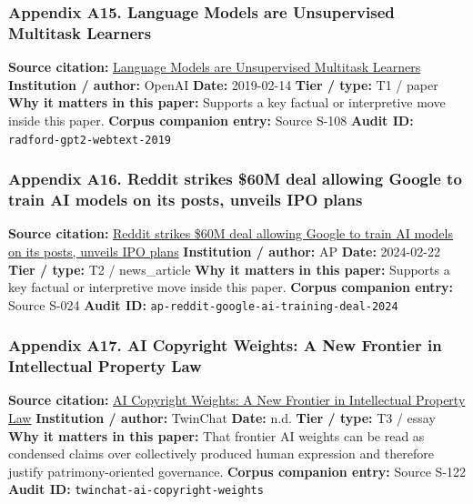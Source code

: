 \documentclass[
  american,
  11pt,
  letterpaper,
]{article}
\begin{document}
\subsubsection{Appendix A15. Language Models are Unsupervised Multitask
Learners}\label{appendix-a15-language-models-are-unsupervised-multitask-learners}

\textbf{Source citation:}
\href{https://cdn.openai.com/better-language-models/language_models_are_unsupervised_multitask_learners.pdf}{Language
Models are Unsupervised Multitask Learners} \textbf{Institution /
author:} OpenAI \textbf{Date:} 2019-02-14 \textbf{Tier / type:} T1 /
paper \textbf{Why it matters in this paper:} Supports a key factual or
interpretive move inside this paper. \textbf{Corpus companion entry:}
Source S-108 \textbf{Audit ID:} \texttt{radford-gpt2-webtext-2019}

\subsubsection{Appendix A16. Reddit strikes \$60M deal allowing Google
to train AI models on its posts, unveils IPO
plans}\label{appendix-a16-reddit-strikes-60m-deal-allowing-google-to-train-ai-models-on-its-posts-unveils-ipo-plans}

\textbf{Source citation:}
\href{https://apnews.com/article/a7f131c7cb4225307134ef21d3c6a708}{Reddit
strikes \$60M deal allowing Google to train AI models on its posts,
unveils IPO plans} \textbf{Institution / author:} AP \textbf{Date:}
2024-02-22 \textbf{Tier / type:} T2 / news\_article \textbf{Why it
matters in this paper:} Supports a key factual or interpretive move
inside this paper. \textbf{Corpus companion entry:} Source S-024
\textbf{Audit ID:} \texttt{ap-reddit-google-ai-training-deal-2024}

\subsubsection{Appendix A17. AI Copyright Weights: A New Frontier in
Intellectual Property
Law}\label{appendix-a17-ai-copyright-weights-a-new-frontier-in-intellectual-property-law}

\textbf{Source citation:}
\href{https://medium.com/twinchat/ai-copyright-weights-a-new-frontier-in-intellectual-property-law-d8ee1b6c55ee}{AI
Copyright Weights: A New Frontier in Intellectual Property Law}
\textbf{Institution / author:} TwinChat \textbf{Date:} n.d. \textbf{Tier
/ type:} T3 / essay \textbf{Why it matters in this paper:} That frontier
AI weights can be read as condensed claims over collectively produced
human expression and therefore justify patrimony-oriented governance.
\textbf{Corpus companion entry:} Source S-122 \textbf{Audit ID:}
\texttt{twinchat-ai-copyright-weights}
\end{document}
